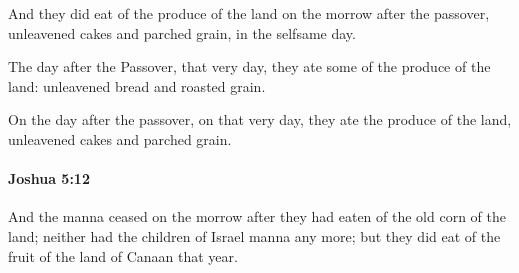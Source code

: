 			\begin{versebox}
					\item[BHS] 
					\item[ASV] And they did eat of the produce of the land on the morrow after the passover, unleavened cakes and parched grain, in the selfsame day.
					\item[NIV] The day after the Passover, that very day, they ate some of the produce of the land: unleavened bread and roasted grain.
					\item[NRSV] On the day after the passover, on that very day, they ate the produce of the land, unleavened cakes and parched grain.
			\end{versebox}

		\paragraph{Joshua 5:12} %
			\label{JOSHUA-5-12}

			And the manna ceased on the morrow after they had eaten of the old corn of the land; neither had the children of Israel manna any more; but they did eat of the fruit of the land of Canaan that year.

